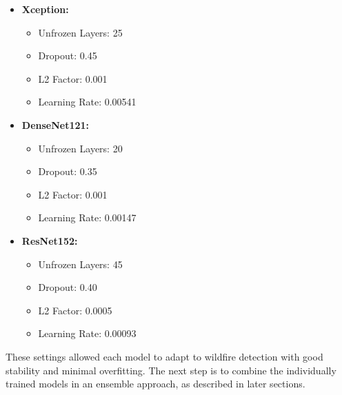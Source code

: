 \begin{itemize}
    \item \textbf{Xception:}
    \begin{itemize}
       \item Unfrozen Layers: 25
       \item Dropout: 0.45
       \item L2 Factor: 0.001
       \item Learning Rate: 0.00541
    \end{itemize}
    \item \textbf{DenseNet121:}
    \begin{itemize}
       \item Unfrozen Layers: 20
       \item Dropout: 0.35
       \item L2 Factor: 0.001
       \item Learning Rate: 0.00147
    \end{itemize}
    \item \textbf{ResNet152:}
    \begin{itemize}
       \item Unfrozen Layers: 45
       \item Dropout: 0.40
       \item L2 Factor: 0.0005
       \item Learning Rate: 0.00093
    \end{itemize}
\end{itemize}

These settings allowed each model to adapt to wildfire detection with good stability and minimal overfitting.
The next step is to combine the individually trained models in an ensemble approach, as described in later sections.
